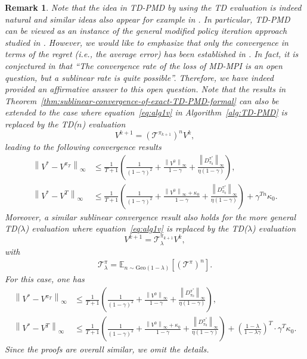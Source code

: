 \documentclass[10pt]{article}
\newcommand{\ls}{\left}
\newcommand{\rs}{\right}
\theoremstyle{plain}
\newtheorem{remark}{Remark}[section]
\theoremstyle{definition}
\begin{document}
{\begin{remark}
    Note that the idea in TD-PMD by using the TD evaluation is indeed  natural
and similar ideas also appear for example in \textup{\cite{winnicki2023convergence,murthy2023performance,Geist_Scherrer_Pietquin_2019}}. In particular, TD-PMD can be viewed as an instance of the general modified policy iteration approach   studied in \textup{\cite{Geist_Scherrer_Pietquin_2019}}. However, we would like to emphasize that  only the convergence in terms of the regret \textup{(}i.e., the average error\textup{)} has been established in \textup{\cite{Geist_Scherrer_Pietquin_2019}}. In fact, it is conjectured in \textup{\cite{Geist_Scherrer_Pietquin_2019}} that ``The
convergence rate of the loss of MD-MPI is an open question, but a sublinear rate is quite possible''. Therefore,  we have indeed provided an affirmative answer to this open question. 
Note that the results in Theorem~\ref{thm:sublinear-convergence-of-exact-TD-PMD-formal} can also be extended to the case  where 
equation~\eqref{eq:alg1v} in Algorithm~\ref{alg:TD-PMD} is replaced by the TD\textup{(}$n$\textup{)} evaluation
\[
V^{k+1}=\left(\mathcal{T}^{\pi_{k+1}}\right)^n V^k,
\] leading to the following convergence results
        \begin{align*}
        \ls\| V^* - V^{\pi_T} \rs\|_\infty &\leq \frac{1}{T+1} \ls( \frac{1}{(1-\gamma)^2} \!+\! \frac{\ls\| V^0 \rs\|_\infty}{1-\gamma} \!+\! \frac{\ls\| D^{\pi^*}_{\pi_0} \rs\|_\infty}{\eta(1-\gamma)} \rs),\\
        \ls\| V^* - V^T \rs\|_\infty &\leq \frac{1}{T+1} \ls( \frac{1}{(1-\gamma)^2} \!+\! \frac{ \ls\| V^0 \rs\|_\infty + \kappa_0}{1-\gamma} \!+\! \frac{\ls\| D^{\pi^*}_{\pi_0} \rs\|_\infty }{\eta(1-\gamma)} \rs) + \gamma^{{Tn}} \kappa_0.
    \end{align*}
Moreover,  a similar sublinear convergence result also holds for 
    the more general TD\textup{(}$\lambda$\textup{)} evaluation where equation~\eqref{eq:alg1v}
     is replaced by the TD\textup{(}$\lambda$\textup{)} evaluation
\[
V^{k+1}=\mathcal{T}_\lambda^{\pi_{k+1}}V^k,
\]
with
\begin{align*}
    \mathcal{T}^\pi_{\lambda}=\mathbb{E}_{n\sim \text{Geo}(1-\lambda)}\left[(\mathcal{T}^\pi)^n\right].
\end{align*}
For this case, one has
\begin{align*}
        \ls\| V^* - V^{\pi_T} \rs\|_\infty &\leq \frac{1}{T+1} \ls( \frac{1}{(1-\gamma)^2} \!+\! \frac{\ls\| V^0 \rs\|_\infty}{1-\gamma} \!+\! \frac{\ls\| D^{\pi^*}_{\pi_0} \rs\|_\infty}{\eta(1-\gamma)} \rs),\\
        \ls\| V^* - V^T \rs\|_\infty &\leq \frac{1}{T+1} \ls( \frac{1}{(1-\gamma)^2} \!+\! \frac{ \ls\| V^0 \rs\|_\infty + \kappa_0}{1-\gamma} \!+\! \frac{\ls\| D^{\pi^*}_{\pi_0} \rs\|_\infty }{\eta(1-\gamma)} \rs) + \left(\frac{1-\lambda}{1-\lambda\gamma}\right)^T\cdot \gamma^T\kappa_0.
    \end{align*}
Since the proofs are overall similar, we omit the details. 
\end{remark}
}
\end{document}
